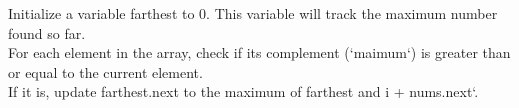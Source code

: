 \documentclass[preview]{standalone}
\begin{document}
Initialize a variable farthest to 0. This variable will track the maximum number found so far.\\For each element in the array, check if its complement (`maimum`) is greater than or equal to the current element.\\If it is, update farthest.next to the maximum of farthest and i + nums.next`.\\
\end{document}
